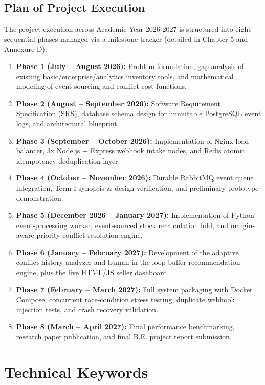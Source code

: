 \documentclass[oneside,a4paper,12pt]{report}
\newcommand{\AcademicYear}{2026-2027}
\begin{document}
\section{Plan of Project Execution}
The project execution across Academic Year \AcademicYear{} is structured into eight sequential phases managed via a milestone tracker (detailed in Chapter 5 and Annexure D):
\begin{enumerate}
  \item \textbf{Phase 1 (July -- August 2026):} Problem formulation, gap analysis of existing basic/enterprise/analytics inventory tools, and mathematical modeling of event sourcing and conflict cost functions.
  \item \textbf{Phase 2 (August -- September 2026):} Software Requirement Specification (SRS), database schema design for immutable PostgreSQL event logs, and architectural blueprint.
  \item \textbf{Phase 3 (September -- October 2026):} Implementation of Nginx load balancer, 3x Node.js + Express webhook intake nodes, and Redis atomic idempotency deduplication layer.
  \item \textbf{Phase 4 (October -- November 2026):} Durable RabbitMQ event queue integration, Term-I synopsis \& design verification, and preliminary prototype demonstration.
  \item \textbf{Phase 5 (December 2026 -- January 2027):} Implementation of Python event-processing worker, event-sourced stock recalculation fold, and margin-aware priority conflict resolution engine.
  \item \textbf{Phase 6 (January -- February 2027):} Development of the adaptive conflict-history analyzer and human-in-the-loop buffer recommendation engine, plus the live HTML/JS seller dashboard.
  \item \textbf{Phase 7 (February -- March 2027):} Full system packaging with Docker Compose, concurrent race-condition stress testing, duplicate webhook injection tests, and crash recovery validation.
  \item \textbf{Phase 8 (March -- April 2027):} Final performance benchmarking, research paper publication, and final B.E. project report submission.
\end{enumerate}

\chapter{Technical Keywords}
\end{document}
